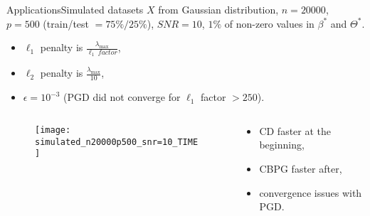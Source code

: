 \documentclass[10pt,aspectratio=43]{beamer}
\begin{document}



\begin{frame}{Applications}{Simulated datasets}
$X$ from Gaussian distribution, $n=20000$, $p=500$ (train/test $=75\%/25\%$), $SNR=10$,
$1\%$ of non-zero values in $\beta^*$ and $\Theta^*$.
\begin{itemize}
    \item $\ell_1$ penalty is $\frac{\lambda_{\max}}{\ell_1\ factor}$,
    \item $\ell_2$ penalty is $\frac{\lambda_{\max}}{10}$,
    \item $\epsilon=10^{-3}$ (PGD did not converge for $\ell_1$ factor
    $> 250$).
\end{itemize}
\begin{columns}
\begin{column}{.59\textwidth}
\begin{figure}[h]
    \centering
    \texttt{[image: simulated\_n20000p500\_snr=10\_TIME]}
\end{figure}
\end{column}
\begin{column}{.4\textwidth}
\begin{itemize}
    \item CD faster at the beginning,
    \item CBPG faster after,
    \item convergence issues with PGD.
\end{itemize}
\end{column}
\end{columns}
\end{frame}
\end{document}
